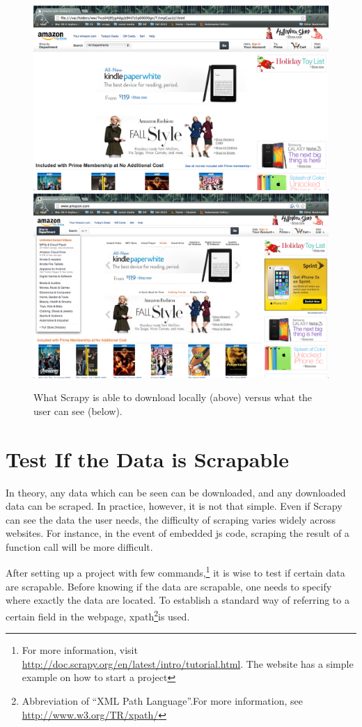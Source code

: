 \documentclass[12pt]{report}
\begin{document}
\begin{figure}[htp]
\includegraphics[width=\textwidth]{amazon_scrapy_view.png}
\includegraphics[width=\textwidth]{amazon_normal_view.png}
\caption[Comparison of views]
{What Scrapy is able to download locally (above) versus what the user can see (below).}
\end{figure}

\section{Test If the Data is Scrapable}
In theory, any data which can be seen can be downloaded, and any downloaded data can be scraped. In practice, however, it is not that simple. Even if Scrapy can see the data the user needs, the difficulty of scraping varies widely across websites. For instance, in the event of embedded \gls{js} code, scraping the result of a function call will be more difficult.

After setting up a project with few commands,\footnote{For more information, visit \url{http://doc.scrapy.org/en/latest/intro/tutorial.html}. The website has a simple example on how to start a project} it is wise to test if certain data are scrapable. Before knowing if the data are scrapable, one needs to specify where exactly the data are located. To establish a standard way of referring to a certain field in the webpage, \gls{xpath}\footnote{Abbreviation of ``XML Path Language''.For more information, see \url{http://www.w3.org/TR/xpath/}}is used.
\end{document}
